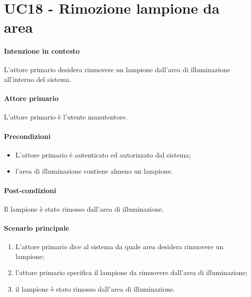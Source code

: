 \section{UC18 - Rimozione lampione da area}\label{uc:18}
\paragraph{Intenzione in contesto} L'attore primario desidera rimuovere un lampione dall'area di illuminazione all'interno del sistema.
\paragraph{Attore primario} L'attore primario è l'utente manutentore.
\paragraph{Precondizioni} 
\begin{itemize}
    \item L'attore primario è autenticato ed autorizzato dal sistema;
    \item l'area di illuminazione contiene almeno un lampione.
\end{itemize}
\paragraph{Post-condizioni} Il lampione è stato rimosso dall'area di illuminazione.
\paragraph{Scenario principale}
\begin{enumerate}
    \item L'attore primario dice al sistema da quale area desidera rimuovere un lampione;
    \item l'attore primario specifica il lampione da rimuovere dall'area di illuminazione;
    \item il lampione è stato rimosso dall'area di illuminazione.
\end{enumerate}